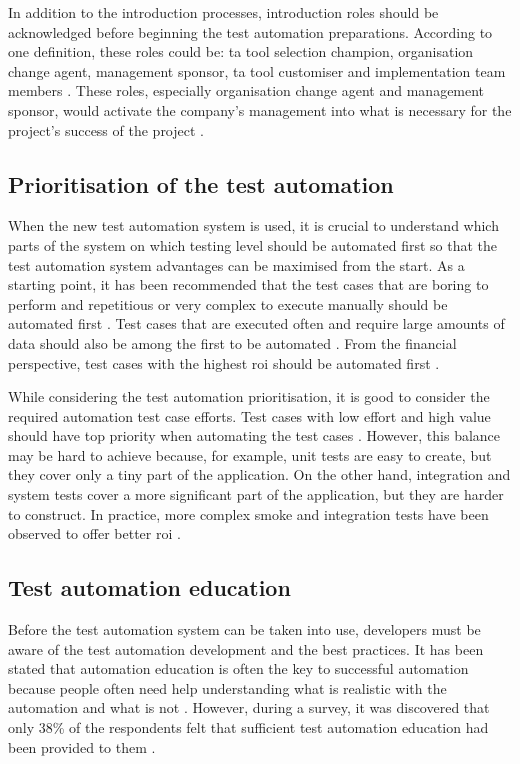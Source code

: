 In addition to the introduction processes, introduction roles should be acknowledged before beginning the test automation preparations. According to one definition, these roles could be: \gls{ta} tool selection champion, organisation change agent, management sponsor, \gls{ta} tool customiser and implementation team members \cite{fewster1999software}. These roles, especially organisation change agent and management sponsor, would activate the company's management into what is necessary for the project's success of the project \cite{fewster1999software,graham2012experiences}.

\subsection{Prioritisation of the test automation}\label{subsection:prioritization_of_the_test_automation}
When the new test automation system is used, it is crucial to understand which parts of the system on which testing level should be automated first so that the test automation system advantages can be maximised from the start. As a starting point, it has been recommended that the test cases that are boring to perform and repetitious or very complex to execute manually should be automated first \cite{graham2012experiences}. Test cases that are executed often and require large amounts of data should also be among the first to be automated \cite{gaur2012automated}. From the financial perspective, test cases with the highest \gls{roi} should be automated first \cite{graham2012experiences}.

While considering the test automation prioritisation, it is good to consider the required automation test case efforts. Test cases with low effort and high value should have top priority when automating the test cases \cite{gunasekaran2015survey, fewster1999software}. However, this balance may be hard to achieve because, for example, unit tests are easy to create, but they cover only a tiny part of the application. On the other hand, integration and system tests cover a more significant part of the application, but they are harder to construct. In practice, more complex smoke and integration tests have been observed to offer better \gls{roi} \cite{berner2005observations}.

\subsection{Test automation education}
Before the test automation system can be taken into use, developers must be aware of the test automation development and the best practices. It has been stated that automation education is often the key to successful automation because people often need help understanding what is realistic with the automation and what is not \cite{graham2012experiences}. However, during a survey, it was discovered that only 38\% of the respondents felt that sufficient test automation education had been provided to them \cite{sundaralingam2021analysis}.

